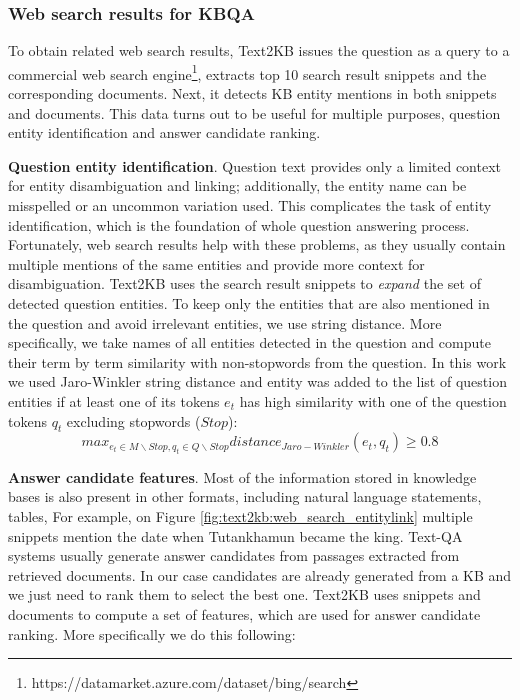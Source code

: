 \subsubsection{Web search results for KBQA}
\label{subsubsec:text2kb:method:web}

To obtain related web search results, Text2KB issues the question as a query to a commercial web search engine\footnote{https://datamarket.azure.com/dataset/bing/search}, extracts top 10 search result snippets and the corresponding documents.
Next, it detects KB entity mentions in both snippets and documents.
This data turns out to be useful for multiple purposes, \ie question entity identification and answer candidate ranking.

\textbf{Question entity identification}.
Question text provides only a limited context for entity disambiguation and linking; additionally, the entity name can be misspelled or an uncommon variation used.
This complicates the task of entity identification, which is the foundation of whole question answering process.
Fortunately, web search results help with these problems, as they usually contain multiple mentions of the same entities and provide more context for disambiguation.
Text2KB uses the search result snippets to {\em expand} the set of detected question entities.
To keep only the entities that are also mentioned in the question and avoid irrelevant entities, we use string distance.
More specifically, we take names of all entities detected in the question and compute their term by term similarity with non-stopwords from the question.
In this work we used Jaro-Winkler string distance and entity was added to the list of question entities if at least one of its tokens $e_t$ has high similarity with one of the question tokens $q_t$ excluding stopwords ($Stop$):
$$max_{e_t \in M\backslash Stop, q_t \in Q\backslash Stop} distance_{Jaro-Winkler}(e_t, q_t) \geq 0.8$$

\textbf{Answer candidate features}.
Most of the information stored in knowledge bases is also present in other formats, including natural language statements, tables, \etc
For example, on Figure \ref{fig:text2kb:web_search_entitylink} multiple snippets mention the date when Tutankhamun became the king.
Text-QA systems usually generate answer candidates from passages extracted from retrieved documents.
In our case candidates are already generated from a KB and we just need to rank them to select the best one.
Text2KB uses snippets and documents to compute a set of features, which are used for answer candidate ranking.
More specifically we do this following:

